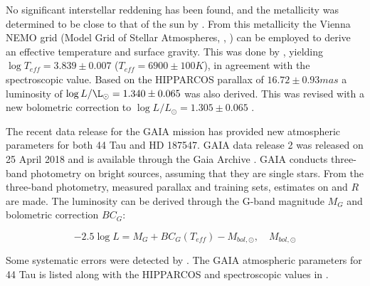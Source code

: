 

No significant interstellar reddening has been found, and the metallicity was determined to be close to that of the sun by \citet{mcnamara1985relations}. From this metallicity the Vienna NEMO grid (Model Grid of Stellar Atmospheres, \citet{nendwich2004interpolation}, \citet{heiter2002new}) can be employed to derive an effective temperature and surface gravity. This was done by \citet{lenz2008asteroseismic}, yielding $ \log T_{eff}= 3.839 \pm 0.007$ ($T_{eff} = 6900 \pm 100 K$), in agreement with the spectroscopic value. Based on the HIPPARCOS parallax of $16.72\pm 0.93 mas$ a luminosity of $\log L/\L_\odot = 1.340 \pm 0.065$ was also derived. This was revised with a new bolometric correction to $\log L/L_\odot = 1.305 \pm 0.065$ \citep{lenz2010delta}. 

The recent data release for the GAIA mission has provided new atmospheric parameters for both 44 Tau and HD 187547. GAIA data release 2 was released on 25 April 2018 and is available through the Gaia Archive \citep{brown2018gaia}. GAIA conducts three-band photometry on bright sources, assuming that they are single stars. From the three-band photometry, measured parallax and training sets, estimates on \teff and $R$ are made. 
The luminosity can be derived through the G-band magnitude $M_G$ and bolometric correction $BC_G$:

\begin{equation}
	-2.5\log L = M_G + BC_G(T_{eff}) - M_{bol,\odot}, \quad M_{bol,\odot}
\end{equation}

Some systematic errors were detected by \citet{andrae2018gaia}. The GAIA atmospheric parameters for 44 Tau is listed along with the HIPPARCOS and spectroscopic values in . 

